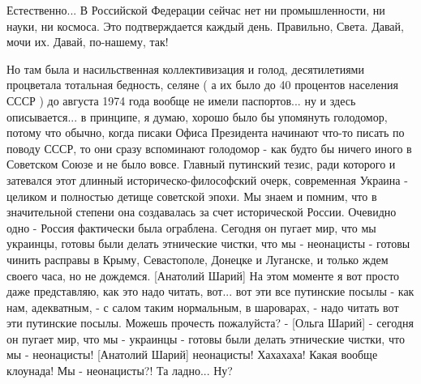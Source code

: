 Естественно... В Российской Федерации сейчас нет ни промышленности, ни науки, ни космоса. Это подтверждается
каждый день. Правильно, Света. Давай, мочи их. Давай, по-нашему, так! 

Но там была и насильственная коллективизация и голод, десятилетиями процветала тотальная бедность, 
селяне ( а их было до 40 процентов населения СССР ) до августа 1974 года вообще
не имели паспортов... ну и здесь описывается... в принципе, я думаю, хорошо было бы упомянуть голодомор,
потому что обычно, когда писаки Офиса Президента начинают что-то писать по поводу СССР, 
то они сразу вспоминают голодомор - как будто бы ничего иного в Советском Союзе 
и не было вовсе. Главный путинский тезис, ради которого и затевался этот длинный историческо-философский 
очерк, современная Украина - целиком и полностью детище советской эпохи. Мы знаем и помним, что в значительной 
степени она создавалась за счет исторической России. Очевидно одно - Россия фактически была ограблена. 
Сегодня он пугает мир, что мы украинцы, готовы были делать этнические чистки, что мы - неонацисты - готовы
чинить расправы в Крыму, Севастополе, Донецке и Луганске, и только ждем своего часа, но не дождемся. 
[Анатолий Шарий] На этом моменте я вот просто даже представляю, как это надо читать, вот... вот эти все путинские посылы - как нам,
адекватным, - с салом таким нормальным, в шароварах, - надо читать вот эти путинские посылы. Можешь прочесть пожалуйста? - 
[Ольга Шарий] - сегодня он пугает мир, что мы - украинцы - готовы были делать этнические чистки, что мы - неонацисты!
[Анатолий Шарий] неонацисты! Хахахаха! Какая вообще клоунада! Мы - неонацисты?! Та ладно... Ну?




